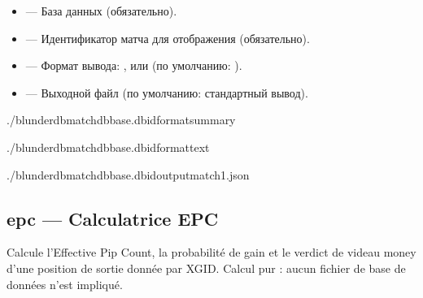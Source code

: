 \documentclass[letterpaper,10pt,russian]{sphinxmanual}
\begin{document}
\sphinxAtStartPar
{}
\begin{itemize}
\item {} 
\sphinxAtStartPar
{} — База данных (обязательно).

\item {} 
\sphinxAtStartPar
{} — Идентификатор матча для отображения (обязательно).

\item {} 
\sphinxAtStartPar
{} — Формат вывода: ,  или  (по умолчанию: ).

\item {} 
\sphinxAtStartPar
{} — Выходной файл (по умолчанию: стандартный вывод).

\end{itemize}

\sphinxAtStartPar
{}

\begin{sphinxVerbatim}[commandchars=\\\{\}]
./blunderdbmatch\PYGZhy{}\PYGZhy{}dbbase.db\PYGZhy{}\PYGZhy{}id\PYGZhy{}\PYGZhy{}formatsummary

./blunderdbmatch\PYGZhy{}\PYGZhy{}dbbase.db\PYGZhy{}\PYGZhy{}id\PYGZhy{}\PYGZhy{}formattext

./blunderdbmatch\PYGZhy{}\PYGZhy{}dbbase.db\PYGZhy{}\PYGZhy{}id\PYGZhy{}\PYGZhy{}outputmatch1.json
\end{sphinxVerbatim}


\subsection{epc — Calculatrice EPC}
\label{\detokenize{cli:epc-calculatrice-epc}}
\sphinxAtStartPar
Calcule l’Effective Pip Count, la probabilité de gain et le verdict de videau
money d’une position de sortie donnée par XGID. Calcul pur : aucun fichier de
base de données n’est impliqué.
\end{document}
